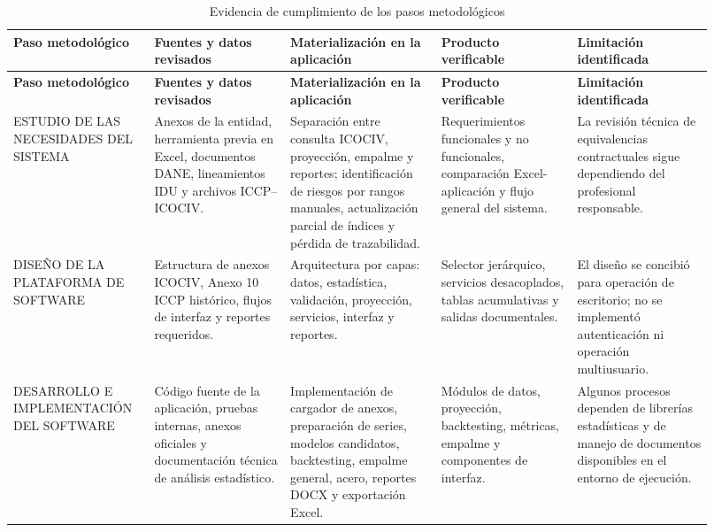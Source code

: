 \documentclass[11pt]{article}
\newcommand{\ICOCIV}{ICOCIV}
\newcommand{\ICCP}{ICCP}
\newcommand{\DANE}{DANE}
\newcommand{\IDU}{IDU}
\begin{document}
\begin{landscape}
\begin{longtable}{@{}>{\raggedright\arraybackslash}p{0.18\linewidth}>{\raggedright\arraybackslash}p{0.18\linewidth}>{\raggedright\arraybackslash}p{0.20\linewidth}>{\raggedright\arraybackslash}p{0.18\linewidth}>{\raggedright\arraybackslash}p{0.18\linewidth}@{}}
\caption{Evidencia de cumplimiento de los pasos metodológicos}\label{tab:evidencia_metodologica}\\
\toprule
\textbf{Paso metodológico} & \textbf{Fuentes y datos revisados} & \textbf{Materialización en la aplicación} & \textbf{Producto verificable} & \textbf{Limitación identificada} \\
\midrule
\endfirsthead
\toprule
\textbf{Paso metodológico} & \textbf{Fuentes y datos revisados} & \textbf{Materialización en la aplicación} & \textbf{Producto verificable} & \textbf{Limitación identificada} \\
\midrule
\endhead
ESTUDIO DE LAS NECESIDADES DEL SISTEMA & Anexos de la entidad, herramienta previa en Excel, documentos \DANE{}, lineamientos \IDU{} y archivos \ICCP--\ICOCIV. & Separación entre consulta \ICOCIV{}, proyección, empalme y reportes; identificación de riesgos por rangos manuales, actualización parcial de índices y pérdida de trazabilidad. & Requerimientos funcionales y no funcionales, comparación Excel-aplicación y flujo general del sistema. & La revisión técnica de equivalencias contractuales sigue dependiendo del profesional responsable. \\
\addlinespace
DISEÑO DE LA PLATAFORMA DE SOFTWARE & Estructura de anexos \ICOCIV{}, Anexo 10 \ICCP{} histórico, flujos de interfaz y reportes requeridos. & Arquitectura por capas: datos, estadística, validación, proyección, servicios, interfaz y reportes. & Selector jerárquico, servicios desacoplados, tablas acumulativas y salidas documentales. & El diseño se concibió para operación de escritorio; no se implementó autenticación ni operación multiusuario. \\
\addlinespace
DESARROLLO E IMPLEMENTACIÓN DEL SOFTWARE & Código fuente de la aplicación, pruebas internas, anexos oficiales y documentación técnica de análisis estadístico. & Implementación de cargador de anexos, preparación de series, modelos candidatos, backtesting, empalme general, acero, reportes DOCX y exportación Excel. & Módulos de datos, proyección, backtesting, métricas, empalme y componentes de interfaz. & Algunos procesos dependen de librerías estadísticas y de manejo de documentos disponibles en el entorno de ejecución. \\

\end{longtable}
\end{landscape}
\end{document}

